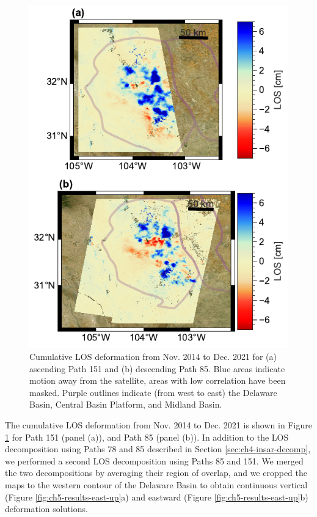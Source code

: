 \begin{figure}
	\centering
	\includegraphics[width=.9\textwidth]{figures/chapter5-lowess/figure-results-los-paths-85-151.pdf}
	\caption[Cumulative 7-year LOS deformation for Paths 85 and 151]{
		Cumulative LOS deformation from Nov. 2014 to Dec. 2021 for (a) ascending Path 151 and (b) descending Path 85.  Blue areas indicate motion away from the satellite, areas with low correlation have been masked.
		Purple outlines indicate (from west to east) the Delaware Basin, Central Basin Platform, and Midland Basin.
	}
	\label{fig:ch5-results-los-paths-85-151}
\end{figure}



\FloatBarrier

The cumulative LOS deformation from Nov. 2014 to Dec. 2021 is shown in Figure \ref{fig:ch5-results-los-paths-85-151} for Path 151 (panel (a)), and Path 85 (panel (b)).
In addition to the LOS decomposition using Paths 78 and 85 described in Section \ref{sec:ch4-insar-decomp}, we performed a second LOS decomposition using Paths 85 and 151.
We merged the two decompositions by averaging their region of overlap, and we cropped the maps to the western contour of the Delaware Basin to obtain continuous vertical (Figure \ref{fig:ch5-results-east-up}a) and eastward (Figure \ref{fig:ch5-results-east-up}b) deformation solutions.


